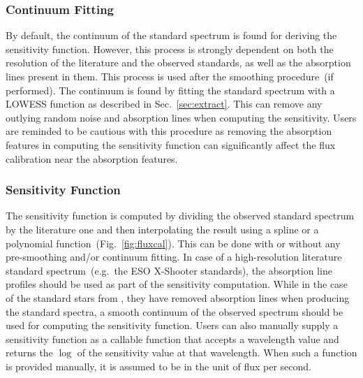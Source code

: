 \documentclass[linenumbers, twocolumn]{aastex631}
\begin{document}
\subsubsection*{Continuum Fitting}
By default, the continuum of the standard spectrum is found for deriving the
sensitivity function. However, this process is strongly dependent on both the
resolution of the literature and the observed standards, as well as the
absorption lines present in them. This process is used after the smoothing
procedure~(if performed). The continuum is found by fitting the standard
spectrum with a LOWESS function as described in Sec.~\ref{sec:extract}. This
can remove any outlying random noise and absorption lines when computing the 
sensitivity. Users are reminded to be cautious with this procedure as removing
the absorption features in computing the sensitivity function can significantly
affect the flux calibration near the absorption features.

\subsubsection*{Sensitivity Function}
The sensitivity function is computed by dividing the observed standard spectrum
by the literature one and then interpolating the result using a spline or a
polynomial function~(Fig.~\ref{fig:fluxcal}). This can be done with or without
any pre-smoothing and/or continuum fitting. In case of a high-resolution
literature standard spectrum~(e.g.\ the ESO X-Shooter standards), the
absorption line profiles should be used as part of the sensitivity computation.
While in the case of the standard stars from \citep{1990AJ.....99.1621O},
they have removed absorption lines when producing the standard spectra, a
smooth continuum of the observed spectrum should be used for computing
the sensitivity function. Users can also manually supply a sensitivity function
as a callable function that accepts a wavelength value and returns the $\log$
of the sensitivity value at that wavelength. When such a function is provided
manually, it is assumed to be in the unit of flux per second.
\end{document}
